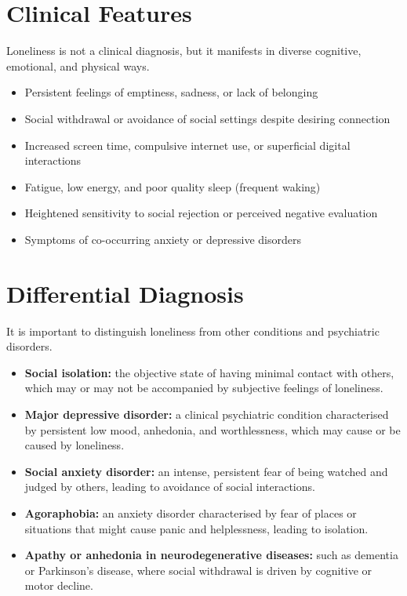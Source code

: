 \section*{Clinical Features}
Loneliness is not a clinical diagnosis, but it manifests in diverse cognitive, emotional, and physical ways.
\begin{itemize}
    \item Persistent feelings of emptiness, sadness, or lack of belonging
    \item Social withdrawal or avoidance of social settings despite desiring connection
    \item Increased screen time, compulsive internet use, or superficial digital interactions
    \item Fatigue, low energy, and poor quality sleep (frequent waking)
    \item Heightened sensitivity to social rejection or perceived negative evaluation
    \item Symptoms of co-occurring anxiety or depressive disorders
\end{itemize}

\section*{Differential Diagnosis}
It is important to distinguish loneliness from other conditions and psychiatric disorders.
\begin{itemize}
    \item \textbf{Social isolation:} the objective state of having minimal contact with others, which may or may not be accompanied by subjective feelings of loneliness.
    \item \textbf{Major depressive disorder:} a clinical psychiatric condition characterised by persistent low mood, anhedonia, and worthlessness, which may cause or be caused by loneliness.
    \item \textbf{Social anxiety disorder:} an intense, persistent fear of being watched and judged by others, leading to avoidance of social interactions.
    \item \textbf{Agoraphobia:} an anxiety disorder characterised by fear of places or situations that might cause panic and helplessness, leading to isolation.
    \item \textbf{Apathy or anhedonia in neurodegenerative diseases:} such as dementia or Parkinson's disease, where social withdrawal is driven by cognitive or motor decline.
\end{itemize}

